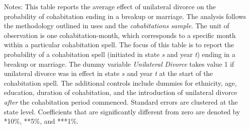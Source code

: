 \begin{table}[H]\centering                                  \scriptsize                                 \caption{The average effect of unilateral divorce on the probability that a cohabitation spell ends (because of marriage or breakup). Unit of observation: cohabitation-month}                                   \label{tab:tabdur}                                 
\begin{minipage}{\textwidth}
\scriptsize\smallskip
Notes: This table reports the average effect of unilateral divorce on the probability of cohabitation ending in a breakup or marriage. The analysis follows the methodology outlined in \cite{borusyak2021} uses and the \textit{cohabitations sample}. The unit of observation is one cohabitation-month, which corresponds to a specific month within a particular cohabitation spell. The focus of this table is to report the probability of a cohabitation spell (initiated in state \textit{s} and year \textit{t}) ending in a breakup or marriage. The dummy variable \textit{Unilateral Divorce} takes value 1 if unilateral divorce was in effect in state \textit{s} and year \textit{t} at the start of the cohabitation spell. The additional controls include dummies for ethnicity, age, education, duration of cohabitation, and the introduction of unilateral divorce \textit{after} the cohabitation period commenced. Standard errors are clustered at the state level. Coefficients that are significantly different from zero are denoted by *10\%, **5\%, and ***1\%.
\\
\end{minipage}
\end{table}
